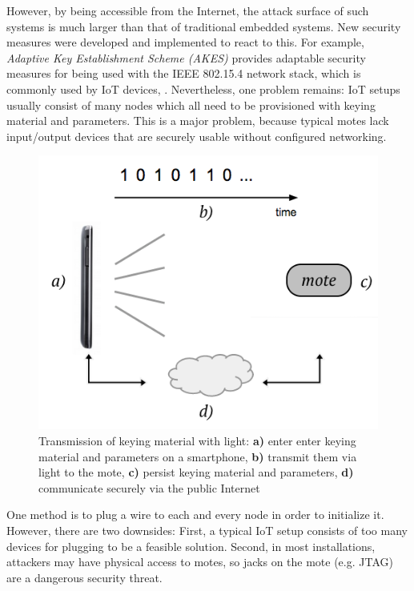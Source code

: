 \documentclass{sig-alternate} %
\begin{document}
However, by being accessible from the Internet, the attack surface of such systems is much larger than that of traditional embedded systems.
New security measures were developed and implemented to react to this.
For example, \textit{Adaptive Key Establishment Scheme (AKES)} provides adaptable security measures for being used with the IEEE 802.15.4 network stack, which is commonly used by IoT devices, \cite{krentz15akes}.
Nevertheless, one problem remains: IoT setups usually consist of many nodes which all need to be provisioned with keying material and parameters.
This is a major problem, because typical motes lack input/output devices that are securely usable without configured networking.

\begin{figure}
	\centering
	\includegraphics[scale=.4]{images/overview.png}
	\caption{Transmission of keying material with light: \textbf{a)} enter enter keying material and parameters on a smartphone, \textbf{b)} transmit them via light to the mote, \textbf{c)} persist keying material and parameters, \textbf{d)} communicate securely via the public Internet }
	\label{fig:overview}
\end{figure}

One method is to plug a wire to each and every node in order to initialize it.
However, there are two downsides: First, a typical IoT setup consists of too many devices for plugging to be a feasible solution. Second, in most installations, attackers may have physical access to motes, so jacks on the mote (e.g. JTAG) are a dangerous security threat.
\end{document}

